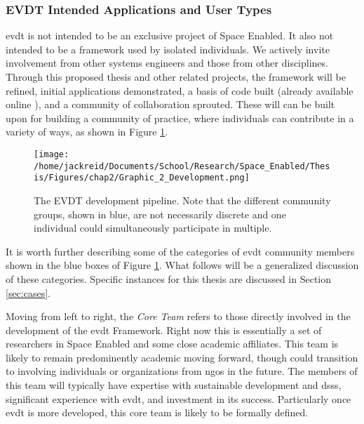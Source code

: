 \documentclass[notitlepage]{article}
\begin{document}

\color{black}

\subsubsection{EVDT Intended Applications and User Types}

\ac{evdt} is not intended to be an exclusive project of Space Enabled. It also not intended to be a framework used by isolated individuals. We actively invite involvement from other systems engineers and those from other disciplines. Through this proposed thesis and other related projects, the framework will be refined, initial applications demonstrated, a basis of code built (already available online \cite{bluerasterBlueRasterVida2021,reidEVDTRepository2020,reidMITVidaRepository2021}), and a community of collaboration sprouted. These will can be built upon for building a community of practice, where individuals can contribute in a variety of ways, as shown in Figure \ref{fig:development}.

\begin{figure}[h]
	\centering
	\texttt{[image: /home/jackreid/Documents/School/Research/Space\_Enabled/Thesis/Figures/chap2/Graphic\_2\_Development.png]}
	\caption{The EVDT development pipeline. Note that the different community groups, shown in blue, are not necessarily discrete and one individual could simultaneously participate in multiple.}
	\label{fig:development}
\end{figure}

\color{OliveGreen}

It is worth further describing some of the categories of \ac{evdt} community members shown in the blue boxes of Figure \ref{fig:development}. What follows will be a generalized discussion of these categories. Specific instances for this thesis are discussed in Section \ref{sec:cases}.

Moving from left to right, the \textit{Core Team} refers to those directly involved in the development of the \ac{evdt} Framework. Right now this is essentially a set of researchers in Space Enabled and some close academic affiliates. This team is likely to remain predominently academic moving forward, though could transition to involving individuals or organizations from \acp{ngo} in the future. The members of this team will typically have expertise with sustainable development and \acp{dss}, significant experience with \ac{evdt}, and investment in its success. Particularly once \ac{evdt} is more developed, this core team is likely to be formally defined.
\end{document}
